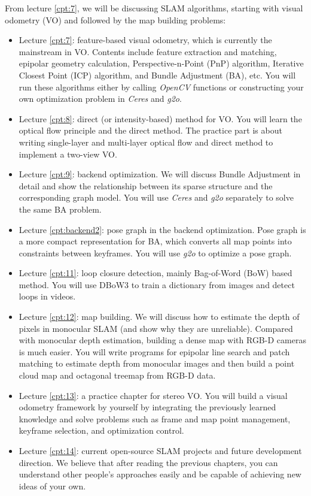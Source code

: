 From lecture \ref{cpt:7}, we will be discussing SLAM algorithms, starting with visual odometry (VO) and followed by the map building problems:
\begin{itemize}
	\item Lecture \ref{cpt:7}: feature-based visual odometry, which is currently the mainstream in VO. Contents include feature extraction and matching, epipolar geometry calculation, Perspective-n-Point (PnP) algorithm, Iterative Closest Point (ICP) algorithm, and Bundle Adjustment (BA), etc. You will run these algorithms either by calling \textit{OpenCV} functions or constructing your own optimization problem in \textit{Ceres} and \textit{g2o}.

	\item Lecture \ref{cpt:8}: direct (or intensity-based) method for VO. You will learn the optical flow principle and the direct method. The practice part is about writing single-layer and multi-layer optical flow and direct method to implement a two-view VO.

	\item Lecture \ref{cpt:9}: backend optimization. We will discuss Bundle Adjustment in detail and show the relationship between its sparse structure and the corresponding graph model. You will use \textit{Ceres} and \textit{g2o} separately to solve the same BA problem.

	\item Lecture \ref{cpt:backend2}: pose graph in the backend optimization. Pose graph is a more compact representation for BA, which converts all map points into constraints between keyframes. You will use \textit{g2o} to optimize a pose graph.

	\item Lecture \ref{cpt:11}: loop closure detection, mainly Bag-of-Word (BoW) based method. You will use DBoW3 to train a dictionary from images and detect loops in videos.

	\item Lecture \ref{cpt:12}: map building. We will discuss how to estimate the depth of pixels in monocular SLAM  (and show why they are unreliable). Compared with monocular depth estimation, building a dense map with RGB-D cameras is much easier. You will write programs for epipolar line search and patch matching to estimate depth from monocular images and then build a point cloud map and octagonal treemap from RGB-D data.

	\item Lecture \ref{cpt:13}: a practice chapter for stereo VO. You will build a visual odometry framework by yourself by integrating the previously learned knowledge and solve problems such as frame and map point management, keyframe selection, and optimization control.

	\item Lecture \ref{cpt:14}: current open-source SLAM projects and future development direction. We believe that after reading the previous chapters, you can understand other people's approaches easily and be capable of achieving new ideas of your own.
\end{itemize}

